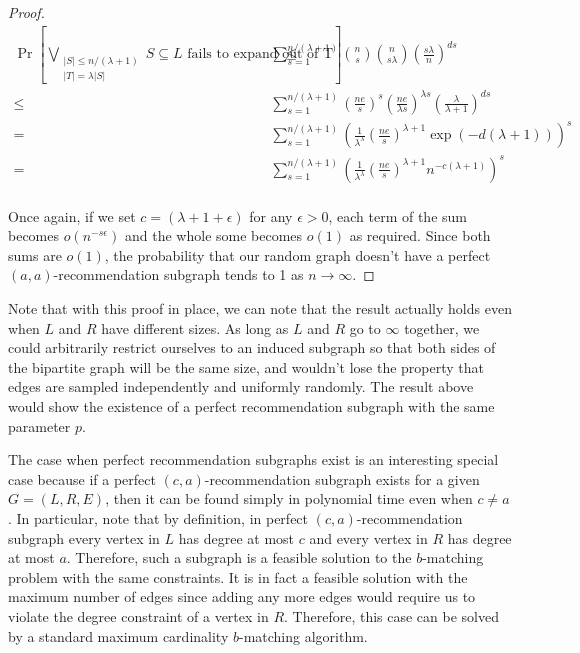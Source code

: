\begin{proof}
\begin{align*}
       \Pr\left[\bigvee_{\substack{|S|\leq n/(\lambda+1) \\ |T| = \lambda |S|}} \text{$S\subseteq L$ fails to expand out of T}\right]
\leq&  \sum_{s=1}^{n/(\lambda+1)} \binom{n}{s}\binom{n}{s\lambda}\left(\frac{s\lambda}{n}\right)^{ds}\\
\leq&  \sum_{s=1}^{n/(\lambda+1)} \left(\frac{ne}{s}\right)^s \left(\frac{ne}{\lambda s}\right)^{\lambda s} \left(\frac{\lambda}{\lambda+1}\right)^{ds}\\
=&     \sum_{s=1}^{n/(\lambda+1)} \left(\frac{1}{\lambda^\lambda}\left(\frac{ne}{s}\right)^{\lambda+1}\exp(-d(\lambda+1))\right)^s \\
=&     \sum_{s=1}^{n/(\lambda+1)} \left(\frac{1}{\lambda^\lambda}\left(\frac{ne}{s}\right)^{\lambda+1}n^{-c(\lambda+1)}\right)^s \\
\end{align*}

Once again, if we set $c=(\lambda+1+\epsilon)$ for any $\epsilon > 0$, each term of the sum becomes $o(n^{-s\epsilon})$ and the whole some becomes $o(1)$ as required. Since both sums are $o(1)$, the probability that our random graph doesn't have a perfect $(a,a)$-recommendation subgraph tends to 1 as $n\to\infty$.

\end{proof}

Note that with this proof in place, we can note that the result actually holds even when $L$ and $R$ have different sizes. As long as $L$ and $R$ go to $\infty$ together, we could arbitrarily restrict ourselves to an induced subgraph so that both sides of the bipartite graph will be the same size, and wouldn't lose the property that edges are sampled independently and uniformly randomly. The result above would show the existence of a perfect recommendation subgraph with the same parameter $p$. \vs

The case when perfect recommendation subgraphs exist is an interesting special case because if a perfect $(c,a)$-recommendation subgraph exists for a given $G=(L,R,E)$, then it can be found simply in polynomial time even when $c\ne a$. In particular, note that by definition, in perfect $(c,a)$-recommendation subgraph every vertex in $L$ has degree at most $c$ and every vertex in $R$ has degree at most $a$. Therefore, such a subgraph is a feasible solution to the $b$-matching problem with the same constraints. It is in fact a feasible solution with the maximum number of edges since adding any more edges would require us to violate the degree constraint of a vertex in $R$. Therefore, this case can be solved by a standard maximum cardinality $b$-matching algorithm. \vs

